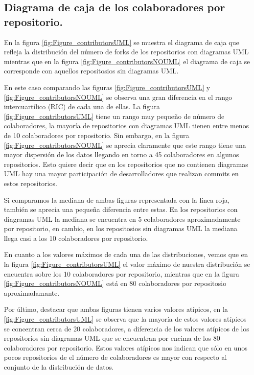 \documentclass[a4paper, 12pt]{book}
\begin{document}
\subsection{Diagrama de caja de los colaboradores por repositorio.}
\label{sec:Diagrama de caja de los colaboradores por repositorio}
En la figura \ref{fig:Figure_contributorsUML} se muestra el diagrama de caja que refleja la distribución del número de forks de los repositorios con diagramas UML mientras que en la figura \ref{fig:Figure_contributorsNOUML} el diagrama de caja se corresponde con aquellos repositosios sin diagramas UML.


En este caso comparando las figuras \ref{fig:Figure_contributorsUML} y \ref{fig:Figure_contributorsNOUML} se observa una gran diferencia en el rango intercuartílico (RIC) de cada una de ellas.
La figura \ref{fig:Figure_contributorsUML} tiene un rango muy pequeño de número de colaboradores, la mayoría de repositorios con diagramas UML tienen entre menos de 10 colaboradores por repositorio.
Sin embargo, en la figura \ref{fig:Figure_contributorsNOUML} se aprecia claramente que este rango tiene una mayor dispersión de los datos llegando en torno a 45 colaboradores en algunos repositorios. 
Esto quiere decir que en los repositorios que no contienen diagramas UML hay una mayor participación de desarrolladores que realizan commits en estos repositorios.


Si comparamos la mediana de ambas figuras representada con la línea roja, también se aprecia una pequeña diferencia entre estas. 
En los repositorios con diagramas UML la mediana se encuentra en 5 colaboradores aproximadamente por repositorio, en cambio, en los repositosios sin diagramas UML la mediana llega casi a los 10 colaboradores por repositorio.


En cuanto a los valores máximos de cada una de las distribuciones, vemos que en la figura \ref{fig:Figure_contributorsUML} el valor máximo de nuestra distribución se encuentra sobre los 10 colaboradores por repositorio, mientras que en la figura \ref{fig:Figure_contributorsNOUML} está en 80 colaboradores por repositosio aproximadamante.


Por último, destacar que ambas figuras tienen varios valores atípicos, en la \ref{fig:Figure_contributorsUML} se observa que la mayoría de estos valores atípicos se concentran cerca de 20 colaboradores, a diferencia de los valores atípicos de los repositorios sin diagramas UML que se encuentran por encima de los 80 colaboradores por repositorio. 
Estos valores atípicos nos indican que sólo en unos pocos repositorios de el número de colaboradores es mayor con respecto al conjunto de la distribución de datos.
\end{document}
